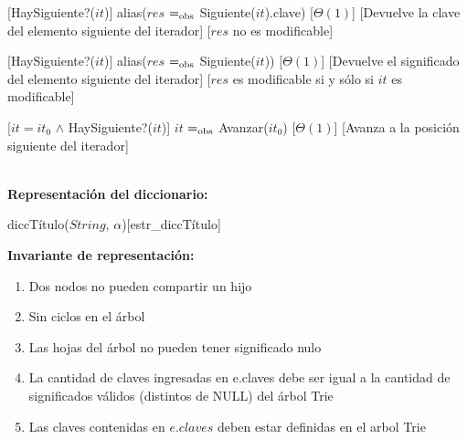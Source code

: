 \begin{Interfaz}
  [HaySiguiente?($it$)]
  {alias($res$ $=_{\mathrm{obs}}$ Siguiente($it$).clave)}
  [$\Theta(1)$]
  [Devuelve la clave del elemento siguiente del iterador]
  [$res$ no es modificable] %

  [HaySiguiente?($it$)]
  {alias($res$ $=_{\mathrm{obs}}$ Siguiente($it$))}
  [$\Theta(1)$]
  [Devuelve el significado del elemento siguiente del iterador]
  [$res$ es modificable si y sólo si $it$ es modificable]
  
  [$it = it_0$ $\land$ HaySiguiente?($it$)]
  {$it$ $=_{\mathrm{obs}}$ Avanzar($it_0$)}
  [$\Theta(1)$]
  [Avanza a la posición siguiente del iterador]
  
  
\end{Interfaz}

\begin{Representacion}\\
\tab\textbf{Representación del diccionario:}
  \begin{Estructura}{diccTítulo($String$, $\alpha$)}[estr\_diccTítulo]
    \begin{Tupla}
    \end{Tupla}
      
    \begin{Tupla}
    \end{Tupla}
  \end{Estructura}  

 \textbf{Invariante de representación:}
 \begin{enumerate}
 	\item Dos nodos no pueden compartir un hijo
    \item Sin ciclos en el árbol
    \item Las hojas del árbol no pueden tener significado nulo
    \item La cantidad de claves ingresadas en e.claves debe ser igual a la cantidad de significados válidos (distintos de NULL) del árbol Trie
    \item Las claves contenidas en $e$.$claves$ deben estar definidas en el arbol Trie
 \end{enumerate}

\end{Representacion}


